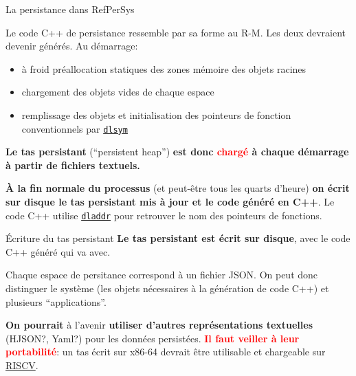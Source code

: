 \documentclass[final,a4,xcolor={svgnames,dvipsnames}]{beamer}
\begin{document}
 \begin{frame}{La persistance dans RefPerSys}

   Le code C++ de persistance ressemble par sa forme au R-M. Les deux devraient devenir générés.
   \medskip
   Au démarrage:
   \begin{itemize}
   \item à froid préallocation statiques des zones mémoire des objets
     racines
   \item chargement des objets vides de chaque espace
     \item remplissage des objets et initialisation des pointeurs de fonction conventionnels par 
         \href{https://man7.org/linux/man-pages/man3/dlsym.3.html}{\texttt{dlsym}}
   \end{itemize}

   \bigskip
   \textbf{Le tas persistant} (``persistent heap'') \textbf{est donc \textcolor{red}{chargé} à chaque
   démarrage à partir de fichiers textuels.}
   
   \bigskip
   \textbf{À la fin normale du processus} (et peut-être tous les
   quarts d'heure) \textbf{on écrit sur disque le tas persistant mis à
     jour et le code généré en C++}. Le code C++ utilise
   \href{https://man7.org/linux/man-pages/man3/dladdr.3.html}{\texttt{dladdr}}
   pour retrouver le nom des pointeurs de fonctions.
   
 \end{frame}

 \begin{frame}{Écriture du tas persistant}
   \textbf{Le tas persistant est écrit sur disque}, avec le code C++ généré qui
   va avec.

   \bigskip
   
   Chaque espace de persitance correspond à un fichier JSON. On peut
   donc distinguer le système (les objets nécessaires à la génération
   de code C++) et plusieurs ``applications''.

   \bigskip
   
   \textbf{On pourrait} à l'avenir \textbf{utiliser d'autres
     représentations textuelles} (HJSON?, Yaml?) pour les données
   persistées. \textbf{\textcolor{red}{Il faut veiller à leur
       portabilité}}: un tas écrit sur x86-64 devrait être utilisable
   et chargeable sur \href{https://riscv.org}{RISCV}.
   
 \end{frame}
\end{document}
